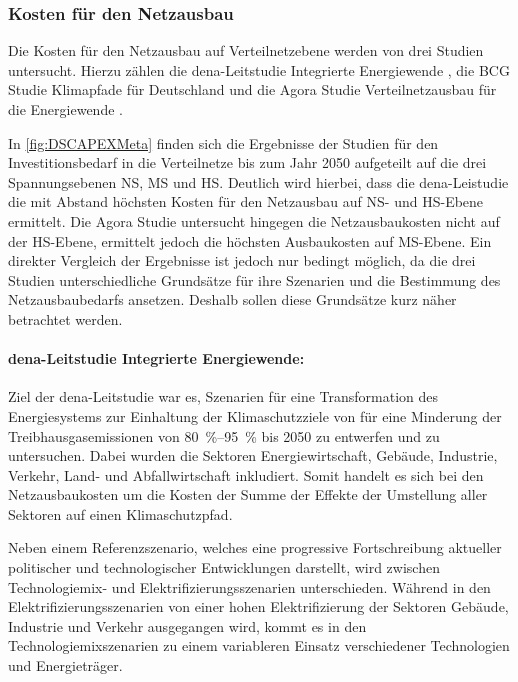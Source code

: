 \subsubsection{Kosten für den Netzausbau}

Die Kosten für den Netzausbau auf Verteilnetzebene werden von drei Studien untersucht.
Hierzu zählen die dena-Leitstudie \glqq Integrierte Energiewende\grqq{} \cite{DEAGH2018}, die BCG Studie \glqq Klimapfade für Deutschland\grqq{} \cite{BCG2018} und die Agora Studie \glqq Verteilnetzausbau für die Energiewende\grqq{} \cite{Agora2019}.



In \autoref{fig:DSCAPEXMeta} finden sich die Ergebnisse der Studien für den Investitionsbedarf in die Verteilnetze bis zum Jahr \num{2050} aufgeteilt auf die drei Spannungsebenen \gls{NS}, \gls{MS} und \gls{HS}.
Deutlich wird hierbei, dass die dena-Leistudie die mit Abstand höchsten Kosten für den Netzausbau auf \gls{NS}- und \gls{HS}-Ebene ermittelt.
Die Agora Studie untersucht hingegen die Netzausbaukosten nicht auf der \gls{HS}-Ebene, ermittelt jedoch die höchsten Ausbaukosten auf \gls{MS}-Ebene.
Ein direkter Vergleich der Ergebnisse ist jedoch nur bedingt möglich, da die drei Studien unterschiedliche Grundsätze für ihre Szenarien und die Bestimmung des Netzausbaubedarfs ansetzen.
Deshalb sollen diese Grundsätze kurz näher betrachtet werden.

\paragraph{dena-Leitstudie \glqq Integrierte Energiewende\grqq{}:}

Ziel der dena-Leitstudie war es, Szenarien für eine Transformation des Energiesystems zur Einhaltung der Klimaschutzziele von für eine Minderung der Treibhausgasemissionen von \SIrange[range-phrase=~{--}~]{80}{95}{\percent} bis \num{2050} zu entwerfen und zu untersuchen.
Dabei wurden die Sektoren Energiewirtschaft, Gebäude, Industrie, Verkehr, Land- und
Abfallwirtschaft inkludiert.
Somit handelt es sich bei den Netzausbaukosten um die Kosten der Summe der Effekte der Umstellung aller Sektoren auf einen Klimaschutzpfad.\medskip

Neben einem Referenzszenario, welches eine progressive Fortschreibung aktueller politischer und technologischer Entwicklungen darstellt, wird zwischen Technologiemix- und Elektrifizierungsszenarien unterschieden.
Während in den Elektrifizierungsszenarien von einer hohen Elektrifizierung der Sektoren Gebäude, Industrie und Verkehr ausgegangen wird, kommt es in den Technologiemixszenarien zu einem variableren Einsatz verschiedener Technologien und Energieträger.\medskip

